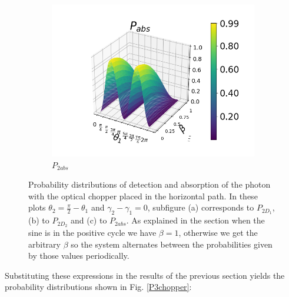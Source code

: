 \documentclass[12pt]{book}
\begin{document}
\begin{figure}[t]
\begin{subfigure}[b]{0.4\linewidth}
\includegraphics[width=\linewidth]{images/PAbs_v.png}
\caption{$P_{2abs}$}
\label{fig:BS1}
\end{subfigure}
\caption{Probability distributions of detection and absorption of the photon with the optical chopper placed in the horizontal path. In these plots $\theta_{2}=\frac{\pi}{2}-\theta_{1}$ and $\gamma_{2}-\gamma_{1}=0$, subfigure (a) corresponds to $P_{2D_{1}}$, (b) to $P_{2D_{2}}$ and (c) to $P_{2abs}$. As explained in the section when the sine is in the positive cycle we have $\beta=1$, otherwise we get the arbitrary $\beta$ so the system alternates between the probabilities given by those values periodically.}
\label{P4chopper}
\end{figure}

Substituting these expressions in the results of the previous section yields the probability distributions shown in Fig. \ref{P3chopper}:
\end{document}

